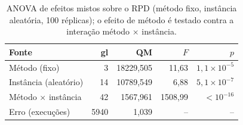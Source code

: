 \begin{table}[t]
\centering
\caption{ANOVA de efeitos mistos sobre o RPD (método fixo, instância aleatória, 100 réplicas); o efeito de método é testado contra a interação método $\times$ instância.}
\label{tab:mixedanova}
\footnotesize
\begin{tabular}{@{}lrrrr@{}}
\toprule
Fonte & gl & QM & $F$ & $p$ \\
\midrule
Método (fixo) & 3 & 18229,505 & 11,63 & $1,1\times10^{-5}$ \\
Instância (aleatório) & 14 & 10789,549 & 6,88 & $5,1\times10^{-7}$ \\
Método $\times$ instância & 42 & 1567,961 & 1508,99 & $<10^{-16}$ \\
Erro (execuções) & 5940 & 1,039 & -- & -- \\
\bottomrule
\end{tabular}
\end{table}
